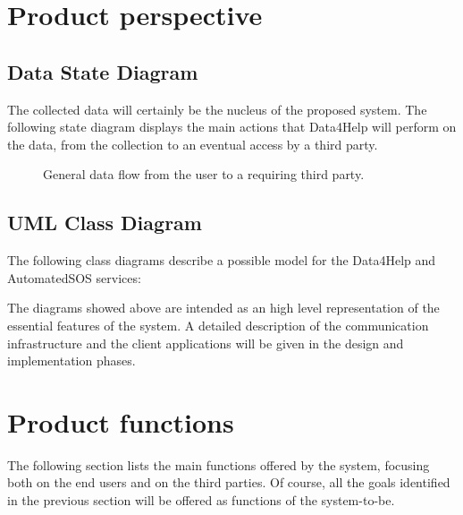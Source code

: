\section{Product perspective}
\subsection{Data State Diagram}
The collected data will certainly be the nucleus of the proposed system. The following state diagram displays the main actions that Data4Help will perform on the data, from the collection to an eventual access by a third party.\\ 
\begin{figure}[H]
    \renewcommand{\thefigure}{\alph{figure}}
    \captionsetup{labelformat=parens, labelsep=space, name=}
    \caption{General data flow from the user to a requiring third party.}
\end{figure}

\subsection{UML Class Diagram}
The following class diagrams describe a possible model for the Data4Help and AutomatedSOS services:

\begin{landscape}

\end{landscape}
\begin{landscape}

\end{landscape}

The diagrams showed above are intended as an high level representation of the essential features of the system. A detailed description of the communication infrastructure and the client applications will be given in the design and implementation phases.   

\section{Product functions}
    The following section lists the main functions offered by the system, focusing both on the end users and on the third parties.
    Of course, all the goals identified in the previous section will be offered as functions of the system-to-be.
    
